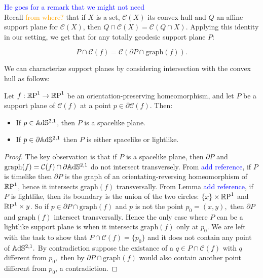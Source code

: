 \textcolor{blue}{He goes for a remark that we might not need}\\

Recall \textcolor{orange}{from where?} that if $X$ is a set, $\mathcal{C}(X)$ its convex hull and $Q$ an affine support plane for $\mathcal{C}(X)$, then $Q\cap\mathcal{C}(X)=\mathcal{C}(Q\cap X).$ Applying this identity in our setting, we get that for any totally geodesic support plane $P$: 

\begin{equation}\label{suplane}
    P\cap\mathcal{C}(f)=\mathcal{C}(\partial P\cap\text{graph}(f)).
\end{equation}
    
We can characterize support planes by considering intersection with the convex hull as follows: 

\begin{proposition}\label{supportinho}
    Let $f:\S\to\S$ be an orientation-preserving homeomorphism, and let $P$ be a support plane of $\mathcal{C}(f)$ at a point $p\in\partial\mathcal{C}(f).$ Then:
    \begin{itemize}
        \item If $p\in\A^{2,1}$, then $P$ is a spacelike plane. 
        \item If $p\in\partial\A^{2,1}$ then $P$ is either spacelike or lightlike.
    \end{itemize}
\end{proposition}
\begin{proof}
    The key observation is that if $P$ is a spacelike plane, then $\partial P$ and $\text{graph}(f)=\mathcal{C}(f)\cap\partial\A^{2,1}$ do not intersect transversely. From \textcolor{blue}{add reference}, if $P$ is timelike then $\partial P$ is the graph of an orientating-reversing homeomorphism of $\S$, hence it intersects $\text{graph}(f)$ transversally. From Lemma \textcolor{blue}{add reference}, if $P$ is lightlike, then its boundary is the union of the two circles: $\{x\}\times\S$ and $\S\times{y}$. So if $p\in\partial P\cap\text{graph}(f)$ and $p$ is not the point $p_0=(x,y),$ then $\partial P$ and $\text{graph}(f)$ intersect transversally. Hence the only case where $P$ can be a lightlike support plane is when it intersects $\text{graph}(f)$ only at $p_0.$ We are left with the task to show that $P\cap\mathcal{C}(f)=\{p_0\}$ and it does not contain any point of $\A^{2,1}.$ By contradiction suppose the existance of a $q\in P\cap\mathcal{C}(f)$ with $q$ different from $p_0,$ then by  $\partial P\cap\text{graph}(f)$ would also contain another point different from $p_0$, a contradiction.
\end{proof}

